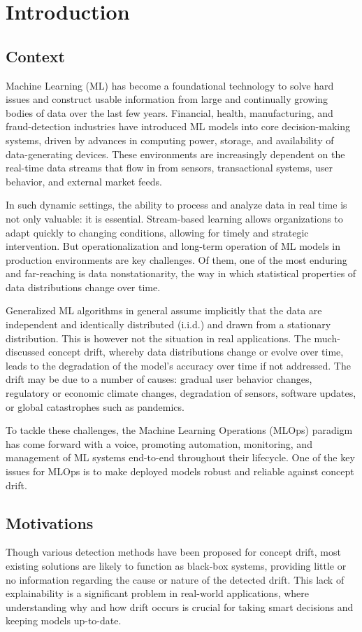 \chapter{Introduction}\label{ch:introduction}

\section{Context}\label{sec:context}
Machine Learning (ML) has become a foundational technology to solve hard issues
and construct usable information from large and continually growing bodies of data
over the last few years. Financial, health, manufacturing, and fraud-detection industries
have introduced ML models into core decision-making systems, driven by advances in
computing power, storage, and availability of data-generating devices. These environments
are increasingly dependent on the real-time data streams that flow in from sensors,
transactional systems, user behavior, and external market feeds.

In such dynamic settings, the ability to process and analyze data in real time
is not only valuable: it is essential. Stream-based learning allows
organizations to adapt quickly to changing conditions, allowing for timely and
strategic intervention. But operationalization and long-term operation of ML
models in production environments are key challenges. Of them, one of the most
enduring and far-reaching is data nonstationarity, the way in which statistical
properties of data distributions change over time.

Generalized ML algorithms in general assume implicitly that the data are
independent and identically distributed (i.i.d.) and drawn from a stationary
distribution. This is however not the situation in real applications. The
much-discussed concept drift, whereby data distributions change or evolve over
time, leads to the degradation of the model's accuracy over time if not
addressed. The drift may be due to a number of causes: gradual user behavior
changes, regulatory or economic climate changes, degradation of sensors,
software updates, or global catastrophes such as pandemics.

To tackle these challenges, the Machine Learning Operations (MLOps) paradigm
has come forward with a voice, promoting automation, monitoring, and management
of ML systems end-to-end throughout their lifecycle. One of the key issues for
MLOps is to make deployed models robust and reliable against concept drift.

\section{Motivations}\label{sec:motivations}
Though various detection methods have been proposed for concept drift, most
existing solutions are likely to function as black-box systems, providing little
or no information regarding the cause or nature of the detected drift. This lack
of explainability is a significant problem in real-world applications, where
understanding why and how drift occurs is crucial for taking smart decisions
and keeping models up-to-date.


